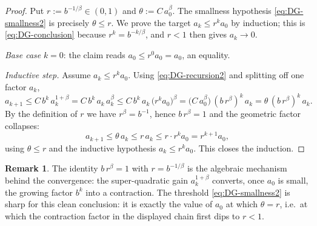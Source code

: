 \documentclass[11pt]{amsart}
\theoremstyle{definition}
\newtheorem{remark}[theorem]{Remark}
\begin{document}
\begin{proof}
Put $r:=b^{-1/\beta}\in(0,1)$ and $\theta:=C\,a_0^{\beta}$.
The smallness hypothesis \eqref{eq:DG-smallness2} is precisely
$\theta\le r$.
We prove the target $a_k\le r^{k}a_0$ by induction; this is
\eqref{eq:DG-conclusion} because $r^k=b^{-k/\beta}$, and $r<1$ then gives
$a_k\to0$.

\emph{Base case} $k=0$: the claim reads $a_0\le r^0a_0=a_0$, an equality.

\emph{Inductive step.} Assume $a_k\le r^{k}a_0$. Using
\eqref{eq:DG-recursion2} and splitting off one factor $a_k$,
\[
   a_{k+1}\le C\,b^{k}\,a_k^{1+\beta}
          =C\,b^{k}\,a_k\,a_k^{\beta}
          \le C\,b^{k}\,a_k\,\bigl(r^{k}a_0\bigr)^{\beta}
          =\bigl(C\,a_0^{\beta}\bigr)\,(b\,r^{\beta})^{k}\,a_k
          =\theta\,(b\,r^{\beta})^{k}\,a_k .
\]
By the definition of $r$ we have $r^{\beta}=b^{-1}$, hence $b\,r^{\beta}=1$
and the geometric factor collapses:
\[
   a_{k+1}\le\theta\,a_k\le r\,a_k\le r\cdot r^{k}a_0=r^{k+1}a_0,
\]
using $\theta\le r$ and the inductive hypothesis $a_k\le r^k a_0$.
This closes the induction.
\end{proof}

\begin{remark}
The identity $b\,r^{\beta}=1$ with $r=b^{-1/\beta}$ is the algebraic
mechanism behind the convergence: the super-quadratic gain
$a_k^{1+\beta}$ converts, once $a_0$ is small, the growing factor $b^k$
into a contraction. The threshold \eqref{eq:DG-smallness2} is sharp for
this clean conclusion: it is exactly the value of $a_0$ at which
$\theta=r$, i.e.\ at which the contraction factor in the displayed chain
first dips to $r<1$.
\end{remark}
\end{document}
